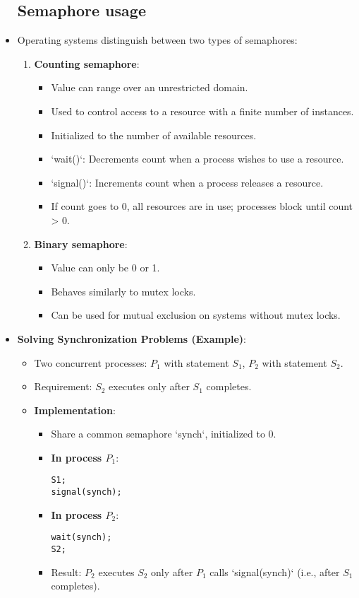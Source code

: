 \begin{itemize}
    \subsection{Semaphore usage}
    \item Operating systems distinguish between two types of semaphores:
    \begin{enumerate}
        \item \textbf{Counting semaphore}:
        \begin{itemize}
            \item Value can range over an unrestricted domain.
            \item Used to control access to a resource with a finite number of instances.
            \item Initialized to the number of available resources.
            \item `wait()`: Decrements count when a process wishes to use a resource.
            \item `signal()`: Increments count when a process releases a resource.
            \item If count goes to 0, all resources are in use; processes block until count > 0.
        \end{itemize}
        \item \textbf{Binary semaphore}:
        \begin{itemize}
            \item Value can only be 0 or 1.
            \item Behaves similarly to mutex locks.
            \item Can be used for mutual exclusion on systems without mutex locks.
        \end{itemize}
    \end{enumerate}
    \item \textbf{Solving Synchronization Problems (Example)}:
    \begin{itemize}
        \item Two concurrent processes: $P_1$ with statement $S_1$, $P_2$ with statement $S_2$.
        \item Requirement: $S_2$ executes only after $S_1$ completes.
        \item \textbf{Implementation}:
        \begin{itemize}
            \item Share a common semaphore `synch`, initialized to 0.
            \item \textbf{In process $P_1$}:
\begin{verbatim}
S1;
signal(synch);
\end{verbatim}
            \item \textbf{In process $P_2$}:
\begin{verbatim}
wait(synch);
S2;
\end{verbatim}
            \item Result: $P_2$ executes $S_2$ only after $P_1$ calls `signal(synch)` (i.e., after $S_1$ completes).
        \end{itemize}
    \end{itemize}


\end{itemize}
